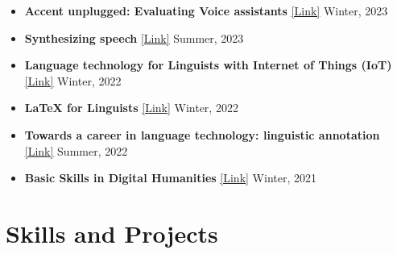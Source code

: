 \documentclass[11pt,a4paper,sans]{moderncv}
\begin{document}
\begin{itemize}
    \item \textbf{Accent unplugged: Evaluating Voice assistants} \href{https://lsf.hhu.de/qisserver/rds?state=verpublish&status=init&vmfile=no&publishid=244439&moduleCall=webInfo&publishConfFile=webInfo&publishSubDir=veranstaltung}{\small{\underline{[Link]}}} \qquad \qquad \qquad \qquad \qquad \quad Winter, 2023
    \item \textbf{Synthesizing speech} \href{https://lsf.hhu.de/qisserver/rds?state=verpublish&status=init&vmfile=no&publishid=240679&moduleCall=webInfo&publishConfFile=webInfo&publishSubDir=veranstaltung}{\small{\underline{[Link]}}} \qquad \qquad \qquad \qquad \qquad \qquad \qquad \qquad \qquad \qquad \qquad Summer, 2023
    \item \textbf{Language technology for Linguists with Internet of Things (IoT)} \href{https://lsf.hhu.de/qisserver/rds?state=verpublish&status=init&vmfile=no&publishid=231180&moduleCall=webInfo&publishConfFile=webInfo&publishSubDir=veranstaltung}{\small{\underline{[Link]}}} \qquad Winter, 2022
    \item \textbf{LaTeX for Linguists} \href{https://lsf.hhu.de/qisserver/rds?state=verpublish&status=init&vmfile=no&publishid=235036&moduleCall=webInfo&publishConfFile=webInfo&publishSubDir=veranstaltung}{\small{\underline{[Link]}}} \qquad \qquad \qquad \qquad \qquad \qquad \qquad \qquad \qquad \qquad \qquad \quad Winter, 2022
    \item \textbf{Towards a career in language technology: linguistic annotation} \href{https://lsf.hhu.de/qisserver/rds?state=verpublish&status=init&vmfile=no&publishid=227683&moduleCall=webInfo&publishConfFile=webInfo&publishSubDir=veranstaltung}{\small{\underline{[Link]}}} \qquad \quad Summer, 2022
    \item \textbf{Basic Skills in Digital Humanities} \href{https://lsf.hhu.de/qisserver/rds?state=verpublish&status=init&vmfile=no&publishid=220184&moduleCall=webInfo&publishConfFile=webInfo&publishSubDir=veranstaltung&noDBAction=y&init=y}{\small{\underline{[Link]}}} \qquad \qquad \qquad \qquad \qquad \qquad \qquad  \qquad \quad Winter, 2021
    
\end{itemize}

\section{Skills and Projects}

\vspace{3pt}
\end{document}
